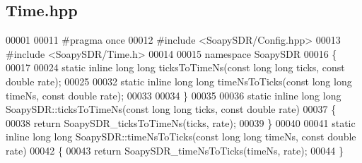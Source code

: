 \subsection{Time.\+hpp}
\label{Time_8hpp_source}

\begin{DoxyCode}
00001 
00011 \textcolor{preprocessor}{#pragma once}
00012 \textcolor{preprocessor}{#include <SoapySDR/Config.hpp>}
00013 \textcolor{preprocessor}{#include <SoapySDR/Time.h>}
00014 
00015 \textcolor{keyword}{namespace }SoapySDR
00016 \{
00017 
00024 \textcolor{keyword}{static} \textcolor{keyword}{inline} \textcolor{keywordtype}{long} \textcolor{keywordtype}{long} ticksToTimeNs(\textcolor{keyword}{const} \textcolor{keywordtype}{long} \textcolor{keywordtype}{long} ticks, \textcolor{keyword}{const} \textcolor{keywordtype}{double} rate);
00025 
00032 \textcolor{keyword}{static} \textcolor{keyword}{inline} \textcolor{keywordtype}{long} \textcolor{keywordtype}{long} timeNsToTicks(\textcolor{keyword}{const} \textcolor{keywordtype}{long} \textcolor{keywordtype}{long} timeNs, \textcolor{keyword}{const} \textcolor{keywordtype}{double} rate);
00033 
00034 \}
00035 
00036 \textcolor{keyword}{static} \textcolor{keyword}{inline} \textcolor{keywordtype}{long} \textcolor{keywordtype}{long} SoapySDR::ticksToTimeNs(\textcolor{keyword}{const} \textcolor{keywordtype}{long} \textcolor{keywordtype}{long} ticks, \textcolor{keyword}{const} \textcolor{keywordtype}{double} 
      rate)
00037 \{
00038     \textcolor{keywordflow}{return} SoapySDR_ticksToTimeNs(ticks, rate);
00039 \}
00040 
00041 \textcolor{keyword}{static} \textcolor{keyword}{inline} \textcolor{keywordtype}{long} \textcolor{keywordtype}{long} SoapySDR::timeNsToTicks(\textcolor{keyword}{const} \textcolor{keywordtype}{long} \textcolor{keywordtype}{long} timeNs, \textcolor{keyword}{const} \textcolor{keywordtype}{double} 
      rate)
00042 \{
00043     \textcolor{keywordflow}{return} SoapySDR_timeNsToTicks(timeNs, rate);
00044 \}
\end{DoxyCode}
